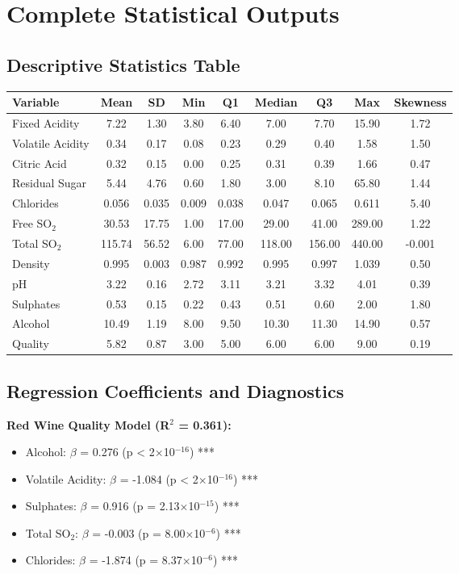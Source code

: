 \appendix

\chapter{Complete Statistical Outputs}

\section{Descriptive Statistics Table}
\begin{longtable}{|l|c|c|c|c|c|c|c|c|}
\hline
\textbf{Variable} & \textbf{Mean} & \textbf{SD} & \textbf{Min} & \textbf{Q1} & \textbf{Median} & \textbf{Q3} & \textbf{Max} & \textbf{Skewness} \\
\hline
Fixed Acidity & 7.22 & 1.30 & 3.80 & 6.40 & 7.00 & 7.70 & 15.90 & 1.72 \\
\hline
Volatile Acidity & 0.34 & 0.17 & 0.08 & 0.23 & 0.29 & 0.40 & 1.58 & 1.50 \\
\hline
Citric Acid & 0.32 & 0.15 & 0.00 & 0.25 & 0.31 & 0.39 & 1.66 & 0.47 \\
\hline
Residual Sugar & 5.44 & 4.76 & 0.60 & 1.80 & 3.00 & 8.10 & 65.80 & 1.44 \\
\hline
Chlorides & 0.056 & 0.035 & 0.009 & 0.038 & 0.047 & 0.065 & 0.611 & 5.40 \\
\hline
Free SO$_2$ & 30.53 & 17.75 & 1.00 & 17.00 & 29.00 & 41.00 & 289.00 & 1.22 \\
\hline
Total SO$_2$ & 115.74 & 56.52 & 6.00 & 77.00 & 118.00 & 156.00 & 440.00 & -0.001 \\
\hline
Density & 0.995 & 0.003 & 0.987 & 0.992 & 0.995 & 0.997 & 1.039 & 0.50 \\
\hline
pH & 3.22 & 0.16 & 2.72 & 3.11 & 3.21 & 3.32 & 4.01 & 0.39 \\
\hline
Sulphates & 0.53 & 0.15 & 0.22 & 0.43 & 0.51 & 0.60 & 2.00 & 1.80 \\
\hline
Alcohol & 10.49 & 1.19 & 8.00 & 9.50 & 10.30 & 11.30 & 14.90 & 0.57 \\
\hline
Quality & 5.82 & 0.87 & 3.00 & 5.00 & 6.00 & 6.00 & 9.00 & 0.19 \\
\hline
\end{longtable}

\section{Regression Coefficients and Diagnostics}
\textbf{Red Wine Quality Model (R$^2$ = 0.361):}
\begin{itemize}
\item Alcohol: $\beta$ = 0.276 (p < 2$\times$10$^{-16}$) ***
\item Volatile Acidity: $\beta$ = -1.084 (p < 2$\times$10$^{-16}$) ***
\item Sulphates: $\beta$ = 0.916 (p = 2.13$\times$10$^{-15}$) ***
\item Total SO$_2$: $\beta$ = -0.003 (p = 8.00$\times$10$^{-6}$) ***
\item Chlorides: $\beta$ = -1.874 (p = 8.37$\times$10$^{-6}$) ***
\end{itemize}

